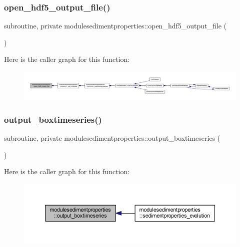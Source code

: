 \subsubsection{\texorpdfstring{open\+\_\+hdf5\+\_\+output\+\_\+file()}{open\_hdf5\_output\_file()}}
{\footnotesize\ttfamily subroutine, private modulesedimentproperties\+::open\+\_\+hdf5\+\_\+output\+\_\+file (\begin{DoxyParamCaption}{ }\end{DoxyParamCaption})\hspace{0.3cm}{\ttfamily [private]}}

Here is the caller graph for this function\+:\nopagebreak
\begin{figure}[H]
\begin{center}
\leavevmode
\includegraphics[width=350pt]{namespacemodulesedimentproperties_a53b69fba92a04f1c26ee8ee39794357d_icgraph}
\end{center}
\end{figure}
\mbox{\label{namespacemodulesedimentproperties_a3a4760ed6e653fdd099e8fe327ae428e}} 
\subsubsection{\texorpdfstring{output\+\_\+boxtimeseries()}{output\_boxtimeseries()}}
{\footnotesize\ttfamily subroutine, private modulesedimentproperties\+::output\+\_\+boxtimeseries (\begin{DoxyParamCaption}{ }\end{DoxyParamCaption})\hspace{0.3cm}{\ttfamily [private]}}

Here is the caller graph for this function\+:\nopagebreak
\begin{figure}[H]
\begin{center}
\leavevmode
\includegraphics[width=350pt]{namespacemodulesedimentproperties_a3a4760ed6e653fdd099e8fe327ae428e_icgraph}
\end{center}
\end{figure}
\mbox{\label{namespacemodulesedimentproperties_adcdacad517c08441d00e6cb73a5bff47}} 
